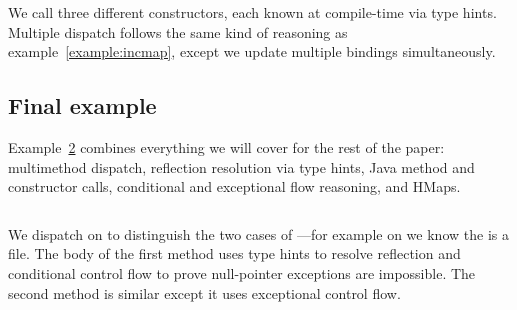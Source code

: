 \begin{figure}
\begin{exmp}
\inputminted[firstline=6,lastline=22]{clojure}{code/demo/src/demo/eg7.clj}
\label{example:multidispatch}
\end{exmp}
\end{figure}

We call three different  constructors, each known at compile-time
via type hints.
Multiple dispatch follows the same kind of reasoning as example~\ref{example:incmap},
except we update multiple bindings simultaneously.

\subsection{Final example}

Example~\ref{example:final}
combines everything we will cover for the rest of the paper:
multimethod dispatch, reflection resolution via type hints, Java method
and constructor calls, conditional and exceptional flow reasoning,
and HMaps. 

\begin{figure}
\begin{exmp}
\inputminted[firstline=6,lastline=20]{clojure}{code/demo/src/demo/eg8.clj}
\label{example:final}
\end{exmp}
\end{figure}

We dispatch on  to distinguish the two cases of ---for example on 
we know the  is a file.
The body of the first method uses type hints to resolve reflection
and conditional control flow to prove null-pointer exceptions are impossible.
The second method is similar except it uses exceptional control flow.









